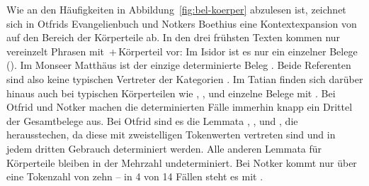 Wie an den Häufigkeiten in Abbildung~\ref{fig:bel-koerper} abzulesen ist, zeichnet sich in Otfrids Evangelienbuch und Notkers Boethius eine  Kontextexpansion von  auf den Bereich der Körperteile ab. 
In den drei frühsten Texten kommen nur vereinzelt Phrasen mit \,+\,Körperteil vor: Im Isidor ist es nur ein einzelner Belege (). Im Monseer Matthäus ist der einzige determinierte Beleg . Beide Referenten sind also keine typischen Vertreter der Kategorien . Im Tatian finden sich darüber hinaus auch bei typischen Körperteilen wie , ,   und  einzelne Belege mit . Bei Otfrid und Notker machen die determinierten Fälle immerhin knapp ein Drittel der Gesamtbelege aus. Bei Otfrid sind es die Lemmata ,  ,   und , die herausstechen, da diese mit zweistelligen Tokenwerten vertreten sind und in jedem dritten Gebrauch determiniert werden. Alle anderen Lemmata für Körperteile bleiben in der Mehrzahl undeterminiert. Bei Notker kommt nur  über eine Tokenzahl von zehn -- in 4 von 14 Fällen steht es mit .

